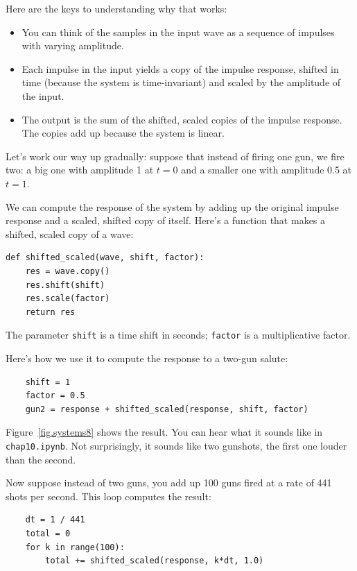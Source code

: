 \documentclass[12pt]{book}
\begin{document}
Here are the keys to understanding why that works:

\begin{itemize}

\item You can think of the samples in the input wave as a sequence
of impulses with varying amplitude.

\item Each impulse in the input yields a copy of the impulse response,
  shifted in time (because the system is time-invariant) and scaled by
  the amplitude of the input.

\item The output is the sum of the shifted, scaled copies of the
  impulse response.  The copies add up because the system is linear.

\end{itemize}

Let's work our way up gradually: suppose that instead of firing one
gun, we fire two: a big one with amplitude 1 at $t=0$ and a
smaller one with amplitude 0.5 at $t=1$.

We can compute the response of the system by adding up
the original impulse response and a scaled, shifted copy of itself.
Here's a function that makes a shifted, scaled copy of
a wave:

\begin{verbatim}
def shifted_scaled(wave, shift, factor):
    res = wave.copy()
    res.shift(shift)
    res.scale(factor)
    return res
\end{verbatim}

The parameter {\tt shift} is a time shift in seconds; {\tt factor}
is a multiplicative factor.

Here's how we use it to compute the response to a two-gun salute:

\begin{verbatim}
    shift = 1
    factor = 0.5
    gun2 = response + shifted_scaled(response, shift, factor)
\end{verbatim}

Figure~\ref{fig.systems8} shows the result.  You can hear what
it sounds like in {\tt chap10.ipynb}.  Not surprisingly, it
sounds like two gunshots, the first one louder than the second.

Now suppose instead of two guns, you add up 100 guns fired at a rate
of 441 shots per second.
This loop computes the result:

\begin{verbatim}
    dt = 1 / 441
    total = 0
    for k in range(100):
        total += shifted_scaled(response, k*dt, 1.0)
\end{verbatim}
\end{document}

